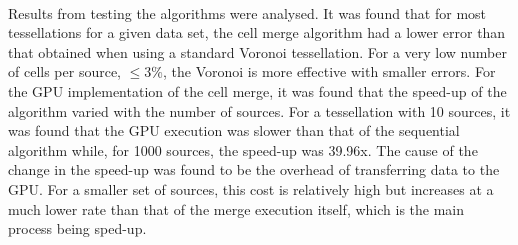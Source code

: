 \\
Results from testing the algorithms were analysed. It was found that for most tessellations for a given data set, the cell merge algorithm had a lower error than that obtained when using a standard Voronoi tessellation. For a very low number of cells per source, $\leq 3\%$, the Voronoi is more effective with smaller errors. For the GPU implementation of the cell merge, it was found that the speed-up of the algorithm varied with the number of sources. For a tessellation with 10 sources, it was found that the GPU execution was slower than that of the sequential algorithm while, for 1000 sources, the speed-up was 39.96x. The cause of the change in the speed-up was found to be the overhead of transferring data to the GPU. For a smaller set of sources, this cost is relatively high but increases at a much lower rate than that of the merge execution itself, which is the main process being sped-up.